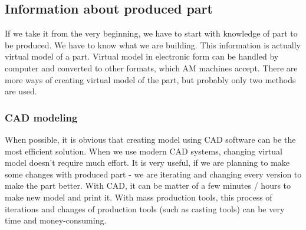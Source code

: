 \documentclass[a4paper, 11pt, reqno]{report}
\begin{document}
\subsection{Information about produced part}
If we take it from the very beginning, we have to start with knowledge of part to be produced. We have to know what we are building. This information is actually virtual model of a part. Virtual model in electronic form can be handled by computer and converted to other formats, which AM machines accept. There are more ways of creating virtual model of the part, but probably only two methods are used.
\subsubsection{CAD modeling}
When possible, it is obvious that creating model using CAD software can be the most efficient solution. When we use modern CAD systems, changing virtual model doesn't require much effort. It is very useful, if we are planning to make some changes with produced part - we are iterating and changing every version to make the part better. With CAD, it can be matter of a few minutes / hours to make new model and print it. With mass production tools, this process of iterations and changes of production tools (such as casting tools) can be very time and money-consuming.
\end{document}
